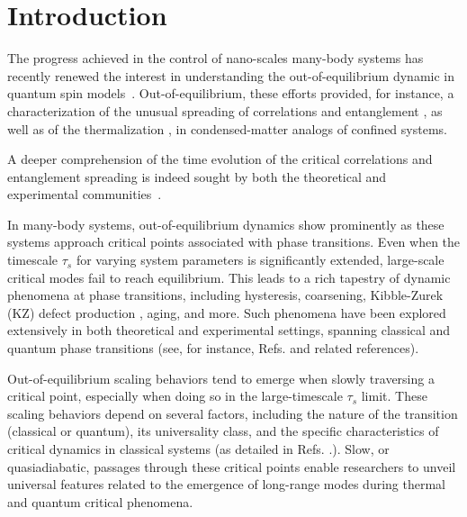 \chapter{Introduction}

The progress achieved in the control of nano-scales many-body systems has recently renewed the interest in understanding the out-of-equilibrium dynamic in quantum spin models~\cite{PSSV-2011-noneqcoll, GAN-2014-quantumsimulation}. Out-of-equilibrium, these efforts provided, for instance, a characterization of the unusual spreading of correlations and entanglement \cite{kormos2017real,lerose2020quasilocalized,tortora2020relaxation,lagnese2022quenches,scopa2022entanglement,castro2020entanglement,vovrosh2021confinement,rigobello2021entanglement}, as well as of the thermalization \cite{birnkammer2022prethermalization,james2019nonthermal,robinson2019signatures,chanda2020confinement}, in condensed-matter analogs of confined systems.


A deeper comprehension of the time evolution of the critical correlations and entanglement spreading is indeed sought by both the theoretical and experimental communities~\cite{ADM-2015-EntanglementReview}.



In many-body systems, out-of-equilibrium dynamics show prominently as these systems approach critical points associated with phase transitions. Even when the timescale $\tau_s$ for varying system parameters is significantly extended, large-scale critical modes fail to reach equilibrium. This leads to a rich tapestry of dynamic phenomena at phase transitions, including hysteresis, coarsening, Kibble-Zurek (KZ) defect production
\cite{kibble1976topology,kibble1980some,zurek1985cosmological,zurek1996cosmological}, aging, and more. Such phenomena have been explored extensively in both theoretical and experimental settings, spanning classical and quantum phase transitions (see, for instance, Refs.                                                                                                                                                                             \cite{binder1987theory, cui2020experimentally, bray2002theory, weiler2008spontaneous,
dziarmaga2010dynamics, PSSV-2011-noneqcoll, ulm2013observation}  and related references).

Out-of-equilibrium scaling behaviors tend to emerge when slowly traversing a critical point, especially when doing so in the large-timescale $\tau_s$ limit. These scaling behaviors depend on several factors, including the nature of the transition (classical or quantum), its universality class, and the specific characteristics of critical dynamics in classical systems (as detailed in Refs. \cite{kibble1980some, zurek1996cosmological, dziarmaga2010dynamics, PSSV-2011-noneqcoll}.). Slow, or quasiadiabatic, passages through these critical points enable researchers to unveil universal features related to the emergence of long-range modes during thermal and quantum critical phenomena.

